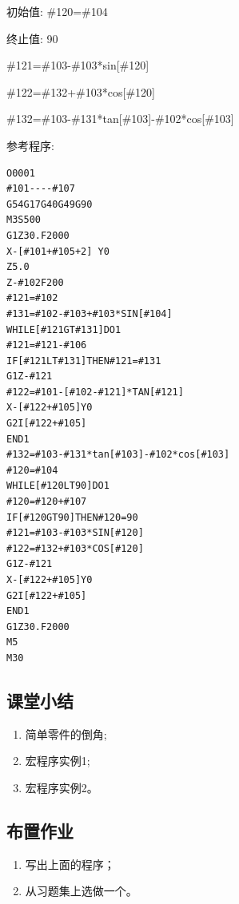初始值: \#120=\#104

终止值: 90

\#121=\#103-\#103*sin[\#120]

\#122=\#132+\#103*cos[\#120]

\#132=\#103-\#131*tan[\#103]-\#102*cos[\#103]

参考程序:

\begin{lstlisting}
O0001
#101----#107
G54G17G40G49G90
M3S500
G1Z30.F2000
X-[#101+#105+2] Y0
Z5.0
Z-#102F200
#121=#102
#131=#102-#103+#103*SIN[#104]
WHILE[#121GT#131]DO1
#121=#121-#106
IF[#121LT#131]THEN#121=#131
G1Z-#121
#122=#101-[#102-#121]*TAN[#121]
X-[#122+#105]Y0
G2I[#122+#105]
END1
#132=#103-#131*tan[#103]-#102*cos[#103]
#120=#104
WHILE[#120LT90]DO1
#120=#120+#107
IF[#120GT90]THEN#120=90
#121=#103-#103*SIN[#120]
#122=#132+#103*COS[#120]
G1Z-#121
X-[#122+#105]Y0
G2I[#122+#105]
END1
G1Z30.F2000
M5
M30
\end{lstlisting}

\subsection{课堂小结}
\begin{enumerate}[1、]
	\item 简单零件的倒角;
	\item 宏程序实例1;
	\item 宏程序实例2。
\end{enumerate}

\vfill
\subsection{布置作业}
\begin{enumerate}[1、]
	\item 写出上面的程序；
	\item 从习题集上选做一个。
\end{enumerate}
\vfill